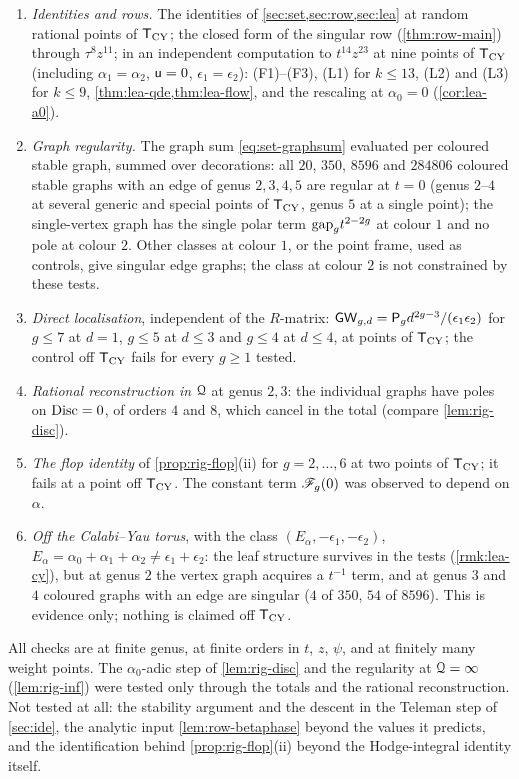 \begin{enumerate}
\item \emph{Identities and rows.} The identities of \cref{sec:set,sec:row,sec:lea} at random rational points of $\mathsf{T}_{\mathrm{CY}}$; the closed form of the singular row (\cref{thm:row-main}) through $\tau^8z^{11}$; in an independent computation to $t^{14}z^{23}$ at nine points of $\mathsf{T}_{\mathrm{CY}}$ (including $\alpha_1=\alpha_2$, $\mathsf{u}=0$, $\epsilon_1=\epsilon_2$): (F1)--(F3), (L1) for $k\leq13$, (L2) and (L3) for $k\leq9$, \cref{thm:lea-qde,thm:lea-flow}, and the rescaling at $\alpha_0=0$ (\cref{cor:lea-a0}).
\item \emph{Graph regularity.} The graph sum \eqref{eq:set-graphsum} evaluated per coloured stable graph, summed over decorations: all $20$, $350$, $8596$ and $284806$ coloured stable graphs with an edge of genus $2,3,4,5$ are regular at $t=0$ (genus $2$--$4$ at several generic and special points of $\mathsf{T}_{\mathrm{CY}}$, genus $5$ at a single point); the single-vertex graph has the single polar term $\mathrm{gap}_g t^{2-2g}$ at colour $1$ and no pole at colour $2$. Other classes at colour $1$, or the point frame, used as controls, give singular edge graphs; the class at colour $2$ is not constrained by these tests.
\item \emph{Direct localisation}, independent of the $R$-matrix: $\mathsf{GW}_{g,d}=\mathsf{P}_{g} d^{2g-3}/(\epsilon_1\epsilon_2)$ for $g\leq7$ at $d=1$, $g\leq5$ at $d\leq3$ and $g\leq4$ at $d\leq4$, at points of $\mathsf{T}_{\mathrm{CY}}$; the control off $\mathsf{T}_{\mathrm{CY}}$ fails for every $g\geq1$ tested.
\item \emph{Rational reconstruction in $\mathcal{Q}$} at genus $2,3$: the individual graphs have poles on $\operatorname{Disc}=0$, of orders $4$ and $8$, which cancel in the total (compare \cref{lem:rig-disc}).
\item \emph{The flop identity} of \cref{prop:rig-flop}(ii) for $g=2,\dots,6$ at two points of $\mathsf{T}_{\mathrm{CY}}$; it fails at a point off $\mathsf{T}_{\mathrm{CY}}$. The constant term $\mathscr{F}_g(0)$ was observed to depend on $\alpha$.
\item \emph{Off the Calabi--Yau torus}, with the class $(E_\alpha,-\epsilon_1,-\epsilon_2)$, $E_\alpha=\alpha_0+\alpha_1+\alpha_2\neq\epsilon_1+\epsilon_2$: the leaf structure survives in the tests (\cref{rmk:lea-cy}), but at genus $2$ the vertex graph acquires a $t^{-1}$ term, and at genus $3$ and $4$ coloured graphs with an edge are singular ($4$ of $350$, $54$ of $8596$). This is evidence only; nothing is claimed off $\mathsf{T}_{\mathrm{CY}}$.
\end{enumerate}
All checks are at finite genus, at finite orders in $t$, $z$, $\psi$, and at finitely many weight points. The $\alpha_0$-adic step of \cref{lem:rig-disc} and the regularity at $\mathcal{Q}=\infty$ (\cref{lem:rig-inf}) were tested only through the totals and the rational reconstruction. Not tested at all: the stability argument and the descent in the Teleman step of \cref{sec:ide}, the analytic input \cref{lem:row-betaphase} beyond the values it predicts, and the identification behind \cref{prop:rig-flop}(ii) beyond the Hodge-integral identity itself.

